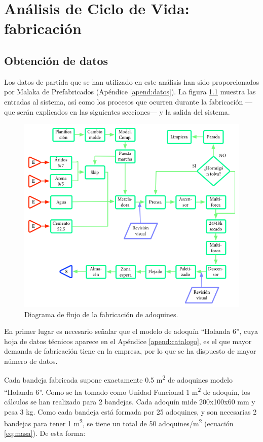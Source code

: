 \chapter{Análisis de Ciclo de Vida: fabricación}

\section{Obtención de datos}\label{sec:obtenciondedatos}
Los datos de partida que se han utilizado en este análisis han sido proporcionados por Malaka de Prefabricados (Apéndice \ref{apend:datos}). La figura \ref{fig:diagrama_de_flujo} muestra las entradas al sistema, así como los procesos que ocurren durante la fabricación —que serán explicados en las siguientes secciones— y la salida del sistema.

\begin{figure}[!htb]
\centering
\includegraphics[width=15cm]{diagrama.png}
\caption{Diagrama de flujo de la fabricación de adoquines.}
\label{fig:diagrama_de_flujo}
\end{figure}

En primer lugar es necesario señalar que el modelo de adoquín ``Holanda 6'', cuya hoja de datos técnicos aparece en el Apéndice \ref{apend:catalogo}, es el que mayor demanda de fabricación tiene en la empresa, por lo que se ha dispuesto de mayor número de datos.

Cada bandeja fabricada supone exactamente 0.5 \si{m^2} de adoquines modelo ``Holanda 6''. Como se ha tomado como Unidad Funcional 1 \si{m^2} de adoquín, los cálculos se han realizado para 2 bandejas. Cada adoquín mide 200x100x60 \si{mm} y pesa 3 \si{kg}. Como cada bandeja está formada por 25 adoquines, y son necesarias 2 bandejas para tener 1 \si{m^2}, se tiene un total de 50 adoquines/\si{m^2} (ecuación \ref{eq:masa}). De esta forma:

